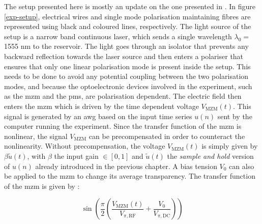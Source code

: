 The setup presented here is mostly an update on the one presented in \cite{AkroutAkram2016Pprc}. In figure \ref{exp-setup}, electrical wires and single mode polarisation maintaining fibres are represented using black and coloured lines, respectively.  The light source of the setup is a narrow band continuous laser, which sends a single wavelength $\lambda_0 =$ 1555 nm to the reservoir. The light goes through an isolator that prevents any backward reflection towards the laser source and then enters a polariser that ensures that only one linear polarisation mode is present inside the setup. This needs to be done to avoid any potential coupling between the two polarisation modes, and because the optoelectronic devices involved in the experiment, such as the \gls{mzm} and the \glspl{pm}, are polarisation dependent. The electric field then enters the \gls{mzm} which is driven by the time dependent voltage $V_{\text{MZM}}(t)$. This signal is generated by an \gls{awg} based on the input time series $u(n)$ sent by the computer running the experiment. Since the transfer function of the \gls{mzm} is nonlinear, the signal $V_{\text{MZM}}$ can be precompensated in order to counteract the nonlinearity. Without precompensation, the voltage $V_{\text{MZM}}(t)$ is simply given by $\beta \tilde{u}(t)$, with $\beta$ the input gain $\in [0,1]$ and $\tilde{u}(t)$ the \textit{sample and hold} version of $u(n)$ already introduced in the previous chapter. A bias tension $V_0$ can also be applied to the \gls{mzm} to change its average transparency. The transfer function of the \gls{mzm} is given by :

\begin{equation}
	\sin{ \left(\frac{\pi}{2} \left(\frac{V_{\text{MZM}}(t)}{V_{\pi,\text{RF}}} + \frac{V_0}{V_{\pi, \text{DC}}} \right) \right)}
\end{equation}


